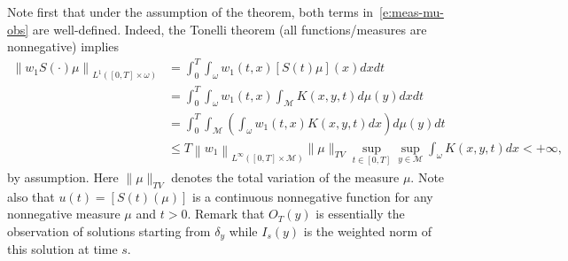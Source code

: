 \documentclass[10pt]{amsart}
\theoremstyle{definition}
\newcommand{\M}{\ensuremath{\mathcal M}}
\newcommand\nor[2]{\left\|#1\right\|_{#2}}
\begin{document}
Note first that under the assumption of the theorem, both terms in~\eqref{e:meas-mu-obs} are well-defined. Indeed, the Tonelli theorem (all functions/measures are nonnegative) implies
\begin{align*}
\nor{w_1 S(\cdot)\mu}{L^1([0,T]\times \omega)} & = \int_0^T \int_\omega w_1(t,x) [S(t)\mu](x) dx dt \\
& = \int_0^T \int_\omega w_1(t,x) \int_{\M} K(x,y,t)d\mu(y) dx dt \\
& = \int_0^T \int_{\M} \left(\int_\omega w_1(t, x) K(x,y,t)dx \right)d\mu(y) dt \\
& \leq T \nor{w_1}{L^\infty([0,T]\times \M)} \|\mu\|_{TV} \sup_{t\in [0,T]} \sup_{y\in \M} \int_\omega K(x,y,t)dx
< + \infty,
\end{align*}
by assumption. Here $\|\mu\|_{TV}$ denotes the total variation of the measure $\mu$.
Note also that $u(t) = [S(t)(\mu)]$ is a continuous nonnegative function for any nonnegative measure $\mu$ and $t>0$.
Remark that $O_T(y)$ is essentially the observation of solutions starting from $\delta_y$ while $I_s(y)$ is the weighted norm of this solution at time $s$.
\end{document}
